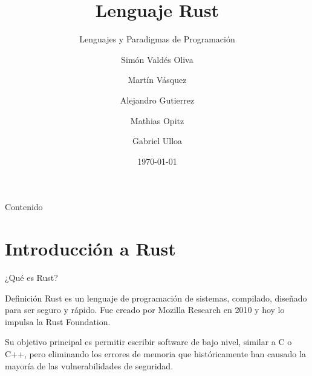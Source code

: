 \documentclass[11pt, aspectratio=169]{beamer}
\begin{document}
	
	\author[Valdés, Vásquez, Gutierrez, Opitz Ulloa]{Simón Valdés Oliva \and Martín Vásquez \and Alejandro Gutierrez \and Mathias Opitz \and Gabriel Ulloa}
	\title[Lenguaje Rust]{Lenguaje Rust}
	\subtitle{Lenguajes y Paradigmas de Programación}
	\date{\today}
	\subject{Lenguajes y Paradigmas de Programación}
	
	\begin{frame}[plain]
		\maketitle
	\end{frame}
	
	\begin{frame}{Contenido}
		\tableofcontents
	\end{frame}
	
	\section{Introducción a Rust}

	\begin{frame}{¿Qué es Rust?}
		\begin{block}{Definición}
			Rust es un lenguaje de programación de sistemas, compilado, diseñado para ser seguro y rápido. Fue creado por Mozilla Research en 2010 y hoy lo impulsa la Rust Foundation.
		\end{block}
		
		\vspace{0.4cm}
		
		Su objetivo principal es permitir escribir software de bajo nivel, similar a C o C++, pero eliminando los errores de memoria que históricamente han causado la mayoría de las vulnerabilidades de seguridad.
	\end{frame}
\end{document}
